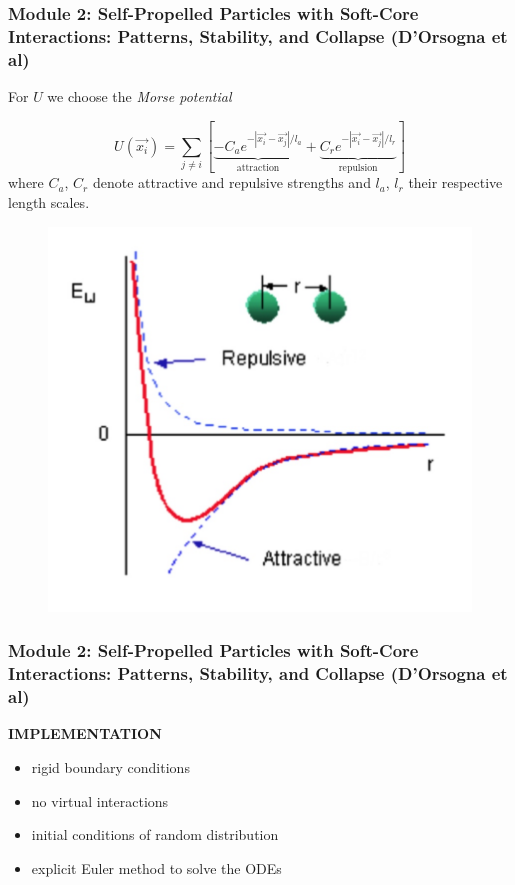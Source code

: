 \documentclass[compress]{beamer}
\begin{document}
\begin{frame}
  \frametitle{Module 2: Self-Propelled Particles with Soft-Core Interactions: Patterns, Stability, and Collapse (D'Orsogna et al)}
	

For \( U \) we choose the \textit{Morse potential} %

\begin{equation} \label{morsePotential}
U(\vec{x_{i}}) = \sum_{j \neq i}^{} [ \underbrace{-C_{a} e^{-| \vec{x_{i}} - \vec{x_{j}} | / l_{a}}}_{\text{attraction}} + \underbrace{C_{r}e^{-|\vec{x_{i}}-\vec{x_{j}}|/l_{r}}}_{\text{repulsion}} ]
\end{equation}
where \( C_{a}\), \( C_{r}\) denote attractive and repulsive strengths and \( l_{a}\), \( l_{r}\) their respective length scales.


\begin{figure}
\includegraphics[width=.4\columnwidth]{./img/Morsepotential.jpg}
\label{morsepotential}
\end{figure}

\end{frame}


\begin{frame}
  \frametitle{Module 2: Self-Propelled Particles with Soft-Core Interactions: Patterns, Stability, and Collapse (D'Orsogna et al)}
	
	\textbf{IMPLEMENTATION}
	
	\begin{itemize}
		\item rigid boundary conditions
		\item no virtual interactions
		\item initial conditions of random distribution
		\item explicit Euler method to solve the ODEs
	\end{itemize}
	

\end{frame}
\end{document}
